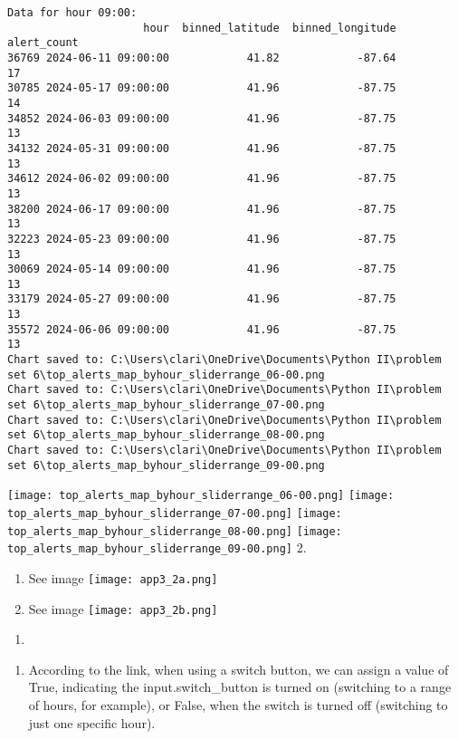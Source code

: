 \documentclass[
  letterpaper,
  DIV=11,
  numbers=noendperiod]{scrartcl}
\providecommand{\tightlist}{%
  \setlength{\itemsep}{0pt}\setlength{\parskip}{0pt}}\usepackage{longtable,booktabs,array}
\begin{document}
\begin{verbatim}
Data for hour 09:00:
                     hour  binned_latitude  binned_longitude  alert_count
36769 2024-06-11 09:00:00            41.82            -87.64           17
30785 2024-05-17 09:00:00            41.96            -87.75           14
34852 2024-06-03 09:00:00            41.96            -87.75           13
34132 2024-05-31 09:00:00            41.96            -87.75           13
34612 2024-06-02 09:00:00            41.96            -87.75           13
38200 2024-06-17 09:00:00            41.96            -87.75           13
32223 2024-05-23 09:00:00            41.96            -87.75           13
30069 2024-05-14 09:00:00            41.96            -87.75           13
33179 2024-05-27 09:00:00            41.96            -87.75           13
35572 2024-06-06 09:00:00            41.96            -87.75           13
Chart saved to: C:\Users\clari\OneDrive\Documents\Python II\problem set 6\top_alerts_map_byhour_sliderrange_06-00.png
Chart saved to: C:\Users\clari\OneDrive\Documents\Python II\problem set 6\top_alerts_map_byhour_sliderrange_07-00.png
Chart saved to: C:\Users\clari\OneDrive\Documents\Python II\problem set 6\top_alerts_map_byhour_sliderrange_08-00.png
Chart saved to: C:\Users\clari\OneDrive\Documents\Python II\problem set 6\top_alerts_map_byhour_sliderrange_09-00.png
\end{verbatim}

\texttt{[image: top\_alerts\_map\_byhour\_sliderrange\_06-00.png]}
\texttt{[image: top\_alerts\_map\_byhour\_sliderrange\_07-00.png]}
\texttt{[image: top\_alerts\_map\_byhour\_sliderrange\_08-00.png]}
\texttt{[image: top\_alerts\_map\_byhour\_sliderrange\_09-00.png]} 2.

\begin{enumerate}
\def\labelenumi{\alph{enumi}.}
\item
  See image \texttt{[image: app3\_2a.png]}
\item
  See image \texttt{[image: app3\_2b.png]}
\end{enumerate}

\begin{enumerate}
\def\labelenumi{\arabic{enumi}.}
\setcounter{enumi}{2}
\tightlist
\item
\end{enumerate}

\begin{enumerate}
\def\labelenumi{\alph{enumi}.}
\tightlist
\item
  According to the link, when using a switch button, we can assign a
  value of True, indicating the input.switch\_button is turned on
  (switching to a range of hours, for example), or False, when the
  switch is turned off (switching to just one specific hour).
\end{enumerate}
\end{document}
